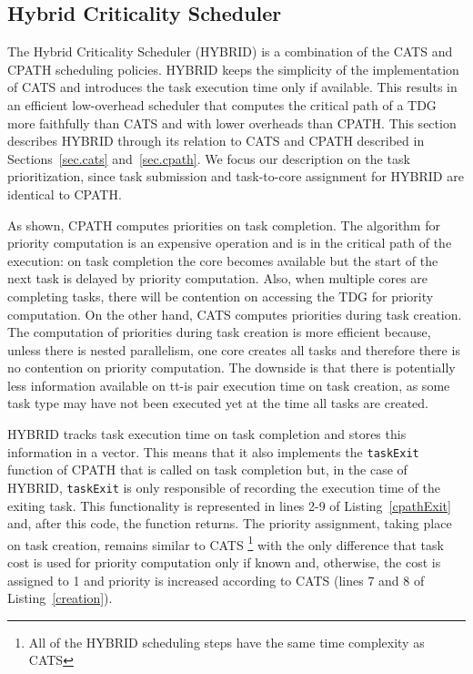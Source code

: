 \subsection{Hybrid Criticality Scheduler}


The Hybrid Criticality Scheduler (HYBRID) is a combination of the CATS and CPATH scheduling policies.
HYBRID keeps the simplicity of the implementation of CATS and introduces the task execution time only if available.
This results in an efficient low-overhead scheduler that computes the critical path of a TDG more faithfully than CATS and with lower overheads than CPATH.
This section describes HYBRID through its relation to CATS and CPATH described in Sections~\ref{sec.cats} and~\ref{sec.cpath}. 
We focus our description on the task prioritization, since task submission and task-to-core assignment for HYBRID are identical to CPATH.

As shown, CPATH computes priorities on task completion. 
The algorithm for priority computation is an expensive operation and is in the critical path of the execution:
on task completion the core becomes available but the start of the next task is delayed by priority computation.
Also, when multiple cores are completing tasks, there will be contention on accessing the TDG for priority computation.
On the other hand, CATS computes priorities during task creation.
The computation of priorities during task creation is more efficient because, unless there is nested parallelism, one core creates all tasks
and therefore there is no contention on priority computation. The downside is that there is potentially less information available 
on tt-is pair execution time on task creation, as some task type may have not been executed yet at the time all tasks are created.


HYBRID tracks task execution time on task completion and stores this information in a vector.
This means that it also implements the \texttt{taskExit} function of CPATH that is called on task completion but, in the case of HYBRID, \texttt{taskExit} is only responsible of recording the execution time of the exiting task.
This functionality is represented in lines 2-9 of Listing~\ref{cpathExit} and, after this code, the function returns.
The priority assignment, taking place on task creation, remains similar to CATS \footnote{All of the HYBRID scheduling steps have the same time complexity as CATS} with the only difference that task cost is used for priority computation only if known and, otherwise, the cost is assigned to 1 and priority is increased according to CATS (lines 7 and 8 of Listing~\ref{creation}).

